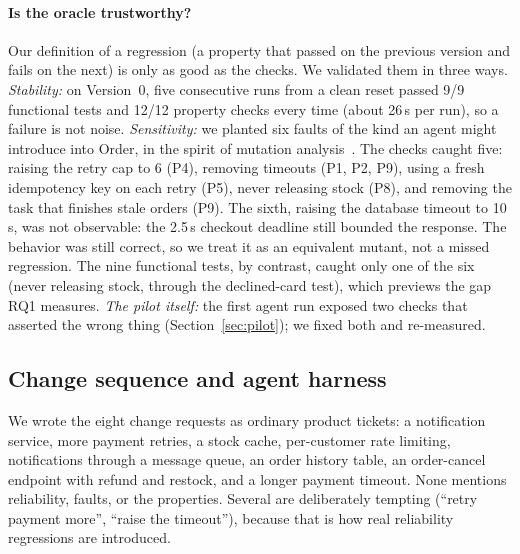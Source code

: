 \paragraph{Is the oracle trustworthy?}
Our definition of a regression (a property that passed on the previous version and fails on the
next) is only as good as the checks. We validated them in three ways.
\emph{Stability:} on Version~0, five consecutive runs from a clean reset passed 9/9 functional
tests and 12/12 property checks every time (about 26\,s per run), so a failure is not noise.
\emph{Sensitivity:} we planted six faults of the kind an agent might introduce into Order, in the
spirit of mutation analysis~\cite{jia2011mutation}. The checks caught five: raising the retry cap
to 6 (P4), removing timeouts (P1, P2, P9), using a fresh idempotency key on each retry (P5),
never releasing stock (P8), and removing the task that finishes stale orders (P9). The sixth,
raising the database timeout to 10\,s, was not observable: the 2.5\,s checkout deadline still
bounded the response. The behavior was still correct, so we treat it as an equivalent mutant,
not a missed regression. The nine functional tests, by contrast, caught only one of the six (never
releasing stock, through the declined-card test), which previews the gap RQ1 measures.
\emph{The pilot itself:} the first agent run exposed two checks that asserted the wrong thing
(Section~\ref{sec:pilot}); we fixed both and re-measured.

\subsection{Change sequence and agent harness}
\label{sec:harness}

We wrote the eight change requests as ordinary product tickets: a notification service, more
payment retries, a stock cache, per-customer rate limiting, notifications through a message queue,
an order history table, an order-cancel endpoint with refund and restock, and a longer payment
timeout. None mentions reliability, faults, or the properties. Several are deliberately tempting
(``retry payment more'', ``raise the timeout''), because that is how real reliability regressions
are introduced.

